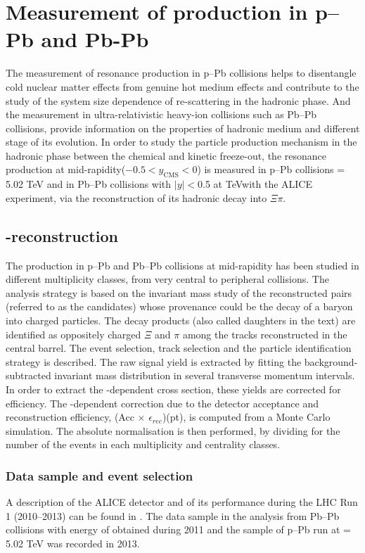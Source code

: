 \section{Measurement of \xis production in p--Pb and Pb-Pb}\label{sec:pPbPbPb}
The measurement of resonance production in p--Pb collisions helps to disentangle cold nuclear matter effects from genuine hot medium effects and contribute to the study of the system size dependence of re-scattering in the hadronic phase. And the measurement in ultra-relativistic heavy-ion collisions such as Pb--Pb collisions, provide information on the properties of hadronic medium and different stage of its evolution. 
In order to study the particle production mechanism in the hadronic phase between the chemical and kinetic freeze-out, the \xis resonance production at mid-rapidity($-0.5<y_{\mathrm{CMS}}<0$) is measured in p--Pb collisions \snn = 5.02  TeV and in Pb--Pb collisions with $|y|<$0.5 at  TeVwith the ALICE experiment, via the reconstruction of its hadronic decay into $\Xi\pi$.

\subsection{\xis-reconstruction}\label{sec:Reconstruction}
The \xiss production in p--Pb and Pb--Pb collisions at mid-rapidity has been studied in different multiplicity classes, from very central to peripheral collisions. The analysis strategy is based on the invariant mass study of the reconstructed pairs (referred to as the candidates) whose provenance could be the decay of a \xiss baryon into charged particles. The decay products (also called daughters in the text) are identified as oppositely charged $\Xi$ and $\pi$ among the tracks reconstructed in the central barrel. The event selection, track selection and the particle identification strategy is described. The raw signal yield is extracted by fitting the background-subtracted invariant mass distribution in several transverse momentum intervals. In order to extract the \pt-dependent cross section, these yields are corrected for efficiency. The \pt-dependent correction due to the detector acceptance and reconstruction efficiency, (Acc $\times$ $\epsilon_{rec}$)(pt), is computed from a Monte Carlo simulation. The absolute normalisation is then performed, by dividing for the number of the events in each multiplicity and centrality classes.


\subsubsection{Data sample and event selection}\label{sec:Selection}
A description of the ALICE detector and of its performance during the LHC Run 1 (2010--2013)
can be found in \cite{cite:ALICE, cite:ALICEPerformance}. The data sample in the analysis from Pb--Pb collisions with energy of  obtained during 2011 and the sample of p--Pb run at \snn = 5.02 TeV was recorded in 2013. 


